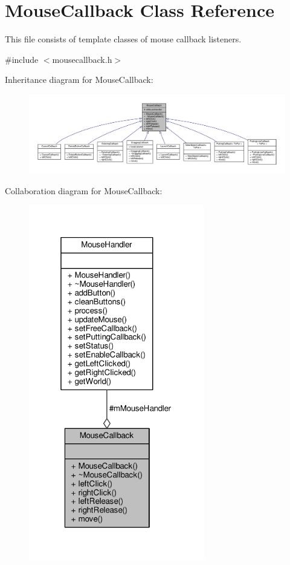 \hypertarget{classMouseCallback}{}\section{Mouse\+Callback Class Reference}
\label{classMouseCallback}


This file consists of template classes of mouse callback listeners.  




{\ttfamily \#include $<$mousecallback.\+h$>$}



Inheritance diagram for Mouse\+Callback\+:\nopagebreak
\begin{figure}[H]
\begin{center}
\leavevmode
\includegraphics[width=350pt]{classMouseCallback__inherit__graph}
\end{center}
\end{figure}


Collaboration diagram for Mouse\+Callback\+:\nopagebreak
\begin{figure}[H]
\begin{center}
\leavevmode
\includegraphics[width=217pt]{classMouseCallback__coll__graph}
\end{center}
\end{figure}
